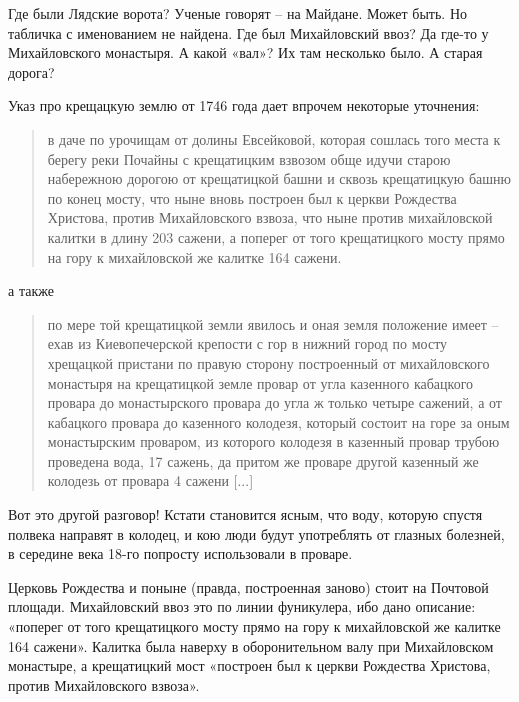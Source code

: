 Где были Лядские ворота? Ученые говорят – на Майдане. Может быть. Но табличка с именованием не найдена. Где был Михайловский ввоз? Да где-то у Михайловского монастыря. А какой «вал»? Их там несколько было. А старая дорога?

Указ про крещацкую землю от 1746 года дает впрочем некоторые уточнения:

\begin{quotation}
в даче по урочищам от долины Евсейковой, которая сошлась того места к берегу реки Почайны с крещатицким взвозом обще идучи старою набережною дорогою от крещатицкой башни и сквозь крещатицкую башню по конец мосту, что ныне вновь построен был к церкви Рождества Христова, против Михайловского взвоза, что ныне против михайловской калитки в длину 203 сажени, а поперег от того крещатицкого мосту прямо на гору к михайловской же калитке 164 сажени.\end{quotation}

а также

\begin{quotation}
по мере той крещатицкой земли явилось и оная земля положение имеет – ехав из Киевопечерской крепости с гор в нижний город по мосту хрещацкой пристани по правую сторону построенный от михайловского монастыря на крещатицкой земле провар от угла казенного кабацкого провара до монастырского провара до угла ж только четыре сажений, а от кабацкого провара до казенного колодезя, который состоит на горе за оным монастырским проваром, из которого колодезя в казенный провар трубою проведена вода, 17 сажень, да притом же проваре другой казенный же колодезь от провара 4 сажени [...]
\end{quotation}

Вот это другой разговор! Кстати становится ясным, что воду, которую спустя полвека направят в колодец, и кою люди будут употреблять от глазных болезней, в середине века 18-го попросту использовали в проваре.

Церковь Рождества и поныне (правда, построенная заново) стоит на Почтовой площади. Михайловский ввоз это по линии фуникулера, ибо дано описание: «поперег от того крещатицкого мосту прямо на гору к михайловской же калитке 164 сажени». Калитка была наверху в оборонительном валу при Михайловском монастыре, а крещатицкий мост «построен был к церкви Рождества Христова, против Михайловского взвоза».

